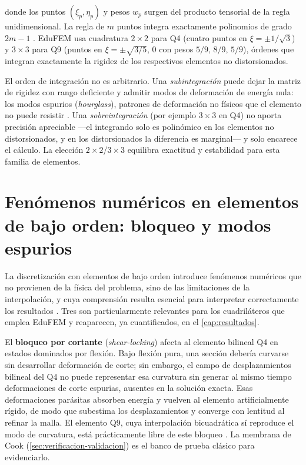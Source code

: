 donde los puntos $(\xi_p,\eta_p)$ y pesos $w_p$ surgen del producto tensorial de la regla unidimensional. La regla de $m$ puntos integra exactamente polinomios de grado $2m-1$ \autocites[pp.~141-142]{hughes2000fem}[p.~161]{zienkiewicz2013fem}. EduFEM usa cuadratura $2\times2$ para Q4 (cuatro puntos en $\xi = \pm 1/\sqrt{3}$) y $3\times3$ para Q9 (puntos en $\xi = \pm\sqrt{3/5},\,0$ con pesos $5/9,\,8/9,\,5/9$), órdenes que integran exactamente la rigidez de los respectivos elementos no distorsionados.

El orden de integración no es arbitrario. Una \emph{subintegración} puede dejar la matriz de rigidez con rango deficiente y admitir modos de deformación de energía nula: los modos espurios (\emph{hourglass}), patrones de deformación no físicos que el elemento no puede resistir \autocite{cook2002concepts,bathe2014fem}. Una \emph{sobreintegración} (por ejemplo $3\times3$ en Q4) no aporta precisión apreciable —el integrando solo es polinómico en los elementos no distorsionados, y en los distorsionados la diferencia es marginal— y solo encarece el cálculo. La elección $2\times2$/$3\times3$ equilibra exactitud y estabilidad para esta familia de elementos.

\section{Fenómenos numéricos en elementos de bajo orden: bloqueo y modos espurios}
\label{sec:locking}

La discretización con elementos de bajo orden introduce fenómenos numéricos que no provienen de la física del problema, sino de las limitaciones de la interpolación, y cuya comprensión resulta esencial para interpretar correctamente los resultados \autocite{cook2002concepts,hughes2000fem,bathe2014fem}. Tres son particularmente relevantes para los cuadriláteros que emplea EduFEM y reaparecen, ya cuantificados, en el \autoref{cap:resultados}.

El \textbf{bloqueo por cortante} (\emph{shear-locking}) afecta al elemento bilineal Q4 en estados dominados por flexión. Bajo flexión pura, una sección debería curvarse sin desarrollar deformación de corte; sin embargo, el campo de desplazamientos bilineal del Q4 no puede representar esa curvatura sin generar al mismo tiempo deformaciones de corte espurias, ausentes en la solución exacta. Esas deformaciones parásitas absorben energía y vuelven al elemento artificialmente rígido, de modo que subestima los desplazamientos y converge con lentitud al refinar la malla. El elemento Q9, cuya interpolación bicuadrática sí reproduce el modo de curvatura, está prácticamente libre de este bloqueo \autocite{cook2002concepts,hughes2000fem}. La membrana de Cook (\autoref{sec:verificacion-validacion}) es el banco de prueba clásico para evidenciarlo.

